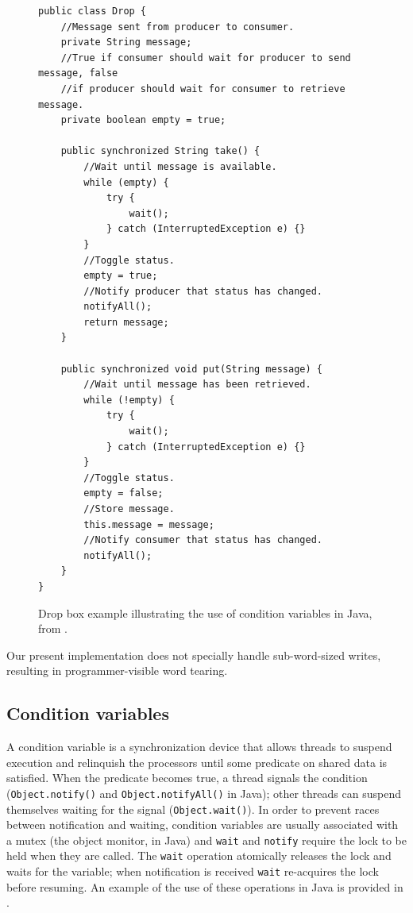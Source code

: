 \begin{figure}\sis\fontsize{9}{10}
\begin{verbatim}
public class Drop {
    //Message sent from producer to consumer.
    private String message;
    //True if consumer should wait for producer to send message, false
    //if producer should wait for consumer to retrieve message.
    private boolean empty = true;

    public synchronized String take() {
        //Wait until message is available.
        while (empty) {
            try {
                wait();
            } catch (InterruptedException e) {}
        }
        //Toggle status.
        empty = true;
        //Notify producer that status has changed.
        notifyAll();
        return message;
    }

    public synchronized void put(String message) {
        //Wait until message has been retrieved.
        while (!empty) {
            try { 
                wait();
            } catch (InterruptedException e) {}
        }
        //Toggle status.
        empty = false;
        //Store message.
        this.message = message;
        //Notify consumer that status has changed.
        notifyAll();
    }
}
\end{verbatim}
\caption[Drop box example illustrating the use of condition variables
  in Java]{Drop box example illustrating the use of condition variables
  in Java, from \cite{ZakhourHoRoRaRiHo06}.}\label{fig:dropbox}
\end{figure}

Our present implementation does not specially handle sub-word-sized
writes, resulting in programmer-visible word tearing.

\subsection{Condition variables}\label{sec:object-wait}
A condition variable is a synchronization device that allows threads
to suspend execution and relinquish the processors until some
predicate on shared data is satisfied.  When the predicate becomes
true, a thread signals the condition (\texttt{Object.notify()} and
\texttt{Object.notifyAll()} in Java); other threads can suspend
themselves waiting for the signal (\texttt{Object.wait()}).  In order
to prevent races between notification and waiting, condition variables
are usually associated with a mutex (the object monitor, in Java) and
\texttt{wait} and \texttt{notify} require the lock to be held when
they are called.  The \texttt{wait} operation atomically releases the
lock and waits for the variable; when notification is received
\texttt{wait} re-acquires the lock before resuming.  An example of the
use of these operations in Java is provided in .

